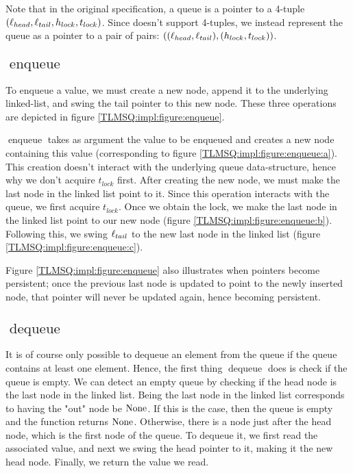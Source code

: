 \documentclass[a4paper, 11pt]{report}
\newcommand{\enqueue}{\operatorname{enqueue}}
\newcommand{\dequeue}{\operatorname{dequeue}}
\newcommand{\Hlock}{h_{lock}}
\newcommand{\Tlock}{t_{lock}}
\begin{document}
Note that in the original specification, a queue is a pointer to a 4-tuple $(\loc_{head}, \loc_{tail}, \Hlock, \Tlock)$. Since \heaplang doesn't support 4-tuples, we instead represent the queue as a pointer to a pair of pairs: $((\loc_{head}, \loc_{tail}), (\Hlock, \Tlock))$.


\subsection[Enqueue]{$\enqueue$}

To enqueue a value, we must create a new node, append it to the underlying linked-list, and swing the tail pointer to this new node. These three operations are depicted in figure \ref{TLMSQ:impl:figure:enqueue}.

$\enqueue$ takes as argument the value to be enqueued and creates a new node containing this value (corresponding to figure \ref{TLMSQ:impl:figure:enqueue:a}). This creation doesn't interact with the underlying queue data-structure, hence why we don't acquire $\Tlock$ first. After creating the new node, we must make the last node in the linked list point to it. Since this operation interacts with the queue, we first acquire $\Tlock$. Once we obtain the lock, we make the last node in the linked list point to our new node (figure \ref{TLMSQ:impl:figure:enqueue:b}). Following this, we swing $\ell_{tail}$ to the new last node in the linked list (figure \ref{TLMSQ:impl:figure:enqueue:c}).

Figure \ref{TLMSQ:impl:figure:enqueue} also illustrates when pointers become persistent; once the previous last node is updated to point to the newly inserted node, that pointer will never be updated again, hence becoming persistent.

\subsection[Dequeue]{$\dequeue$}

It is of course only possible to dequeue an element from the queue if the queue contains at least one element. Hence, the first thing $\dequeue$ does is check if the queue is empty. We can detect an empty queue by checking if the head node is the last node in the linked list. Being the last node in the linked list corresponds to having the "out" node be $\operatorname{None}$. If this is the case, then the queue is empty and the function returns $\operatorname{None}$. Otherwise, there is a node just after the head node, which is the first node of the queue. To dequeue it, we first read the associated value, and next we swing the head pointer to it, making it the new head node. Finally, we return the value we read.
\end{document}
